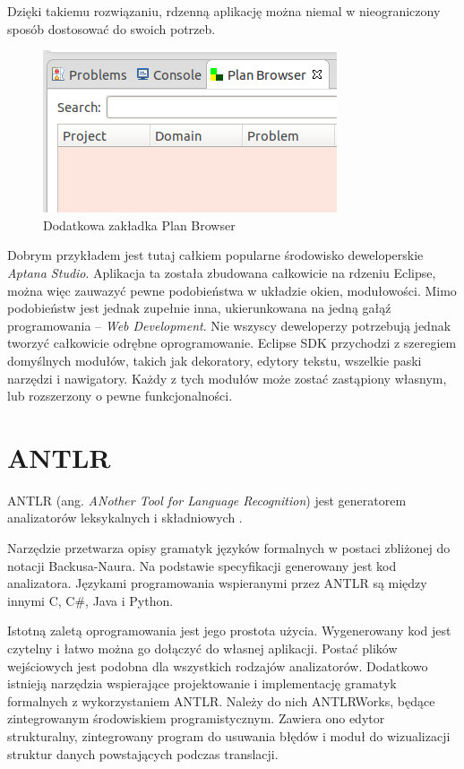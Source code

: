 Dzięki takiemu rozwiązaniu, rdzenną aplikację można niemal w nieograniczony sposób dostosować do swoich potrzeb.
\begin{figure}[h]
  \centering
    \includegraphics{img/custom-window.png}
    \caption{Dodatkowa zakładka Plan Browser}
    \label{ana_structure}
\end{figure}
Dobrym przykładem jest tutaj całkiem popularne środowisko deweloperskie \emph{Aptana Studio}. Aplikacja ta została zbudowana całkowicie na rdzeniu Eclipse, można więc zauwazyć pewne podobieństwa w układzie okien, modułowości. Mimo podobieństw jest jednak zupełnie inna, ukierunkowana na jedną gałąź programowania – \emph{Web Development}. Nie wszyscy deweloperzy potrzebują jednak tworzyć całkowicie odrębne oprogramowanie. Eclipse SDK przychodzi z szeregiem domyślnych modułów, takich jak dekoratory, edytory tekstu, wszelkie paski narzędzi i nawigatory. Każdy z tych modułów może zostać zastąpiony własnym, lub rozszerzony o pewne funkcjonalności.


\section{ANTLR}
ANTLR (ang. \emph{ANother Tool for Language Recognition}) jest generatorem
analizatorów leksykalnych i składniowych \cite{antlr}.

Narzędzie przetwarza opisy gramatyk języków formalnych w postaci 
zbliżonej do notacji
 Backusa-Naura. Na podstawie specyfikacji generowany jest kod analizatora.
Językami programowania wspieranymi przez ANTLR są między innymi C, C\#, Java
i Python.

Istotną zaletą oprogramowania jest jego prostota użycia. Wygenerowany kod 
jest czytelny i łatwo można go dołączyć do własnej aplikacji. Postać plików
wejściowych jest podobna dla wszystkich rodzajów analizatorów. Dodatkowo
istnieją narzędzia wspierające projektowanie i implementację gramatyk
formalnych z wykorzystaniem ANTLR. Należy do nich ANTLRWorks, będące
zintegrowanym środowiskiem programistycznym. Zawiera ono edytor strukturalny,
zintegrowany program do usuwania błędów i moduł do wizualizacji struktur 
danych powstających podczas translacji.

